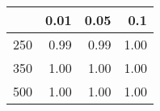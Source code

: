 % 
\begin{tabular}{rrrr}
  \hline
 & 0.01 & 0.05 & 0.1 \\ 
  \hline
250 & 0.99 & 0.99 & 1.00 \\ 
  350 & 1.00 & 1.00 & 1.00 \\ 
  500 & 1.00 & 1.00 & 1.00 \\ 
   \hline
\end{tabular}
